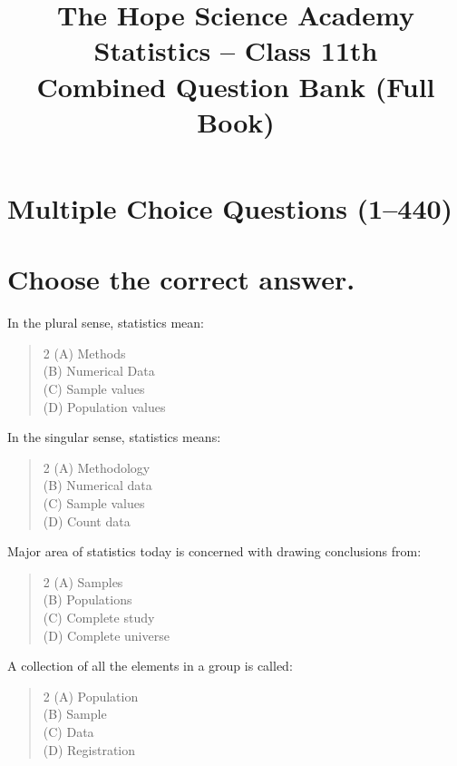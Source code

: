 \documentclass[11pt,a4paper]{article}
\title{\textbf{The Hope Science Academy}\\[2pt]\large Statistics -- Class 11th\\[2pt]\normalsize Combined Question Bank (Full Book)}
\author{}
\date{}
\begin{document}
\maketitle
\tableofcontents
\newpage

\section{Multiple Choice Questions (1--440)}

\section*{Choose the correct answer.}

\begin{mcqlist}

\item In the plural sense, statistics mean:
\begin{quote}\begin{multicols}{2}
\noindent (A) Methods \\
(B) Numerical Data \\
(C) Sample values \\
(D) Population values
\end{multicols}\end{quote}

\item In the singular sense, statistics means:
\begin{quote}\begin{multicols}{2}
\noindent (A) Methodology \\
(B) Numerical data \\
(C) Sample values \\
(D) Count data
\end{multicols}\end{quote}

\item Major area of statistics today is concerned with drawing conclusions from:
\begin{quote}\begin{multicols}{2}
\noindent (A) Samples \\
(B) Populations \\
(C) Complete study \\
(D) Complete universe
\end{multicols}\end{quote}

\item A collection of all the elements in a group is called:
\begin{quote}\begin{multicols}{2}
\noindent (A) Population \\
(B) Sample \\
(C) Data \\
(D) Registration
\end{multicols}\end{quote}


\end{mcqlist}
\end{document}
